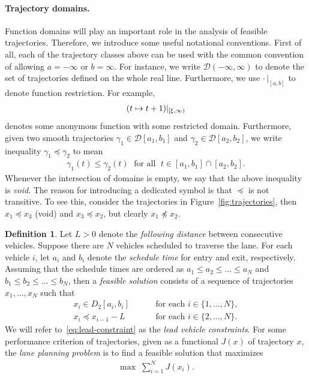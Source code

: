 \documentclass[a4paper]{article}
\theoremstyle{definition}
\newtheorem{define}{Definition\hspace{0.25em}\ignorespaces}
\theoremstyle{plain}
\begin{document}
\paragraph{Trajectory domains.}
Function domains will play an important role in the analysis of feasible
trajectories. Therefore, we introduce some useful notational conventions.
%
First of all, each of the trajectory classes above can be used with the common
convention of allowing $a = -\infty$ or $b = \infty$. For instance, we write
$\mathcal{D}(-\infty, \infty)$ to denote the set of trajectories defined on the
whole real line.
%
Furthermore, we use $\cdot\,|_{[a,b]}$ to denote function restriction. For example,
\begin{align*}
  (t \mapsto t + 1)|_{[\xi,\infty)}
\end{align*}
denotes some anonymous function with some restricted domain.
%
Furthermore, given two smooth trajectories $\gamma_{1} \in \mathcal{D}[a_{1}, b_{1}]$
and $\gamma_{2} \in \mathcal{D}[a_{2}, b_{2}]$, we write inequality
  $\gamma_{1} \preceq \gamma_{2}$ to mean
\begin{align*}
\gamma_{1}(t) \leq \gamma_{2}(t) \; \text{ for all } \; t \in [a_{1}, b_{1}] \cap [a_{2}, b_{2}] .
\end{align*}
%
Whenever the intersection of domains is empty, we say that the above inequality
is \emph{void}.
%
The reason for introducing a dedicated symbol is that $\preceq$ is not transitive.
To see this, consider the trajectories in Figure~\ref{fig:trajectories}, then
$x_{1} \preceq x_{3}$ (void) and $x_{3} \preceq x_{2}$, but clearly
$x_{1} \npreceq x_{2}$.

\begin{define}
  Let $L > 0$ denote the \textit{following distance} between consecutive vehicles.
  Suppose there are $N$ vehicles scheduled to traverse the lane. For each
  vehicle $i$, let $a_{i}$ and $b_{i}$ denote the \textit{schedule time} for entry and
  exit, respectively.
  Assuming that the schedule times are ordered as
  $a_{1} \leq a_{2} \leq \dots \leq a_{N}$ and
  $b_{1} \leq b_{2} \leq \dots \leq b_{N} $, then a \emph{feasible solution} consists
  of a sequence of trajectories $x_{1}, \dots, x_{N}$ such that
\begin{subequations}\label{eq:feasibility}
\begin{align}
x_{i} \in D_{2}[a_{i}, b_{i}] \quad \quad & \text{ for each } i \in \{1, \dots, N\}, \label{eq:second-order-constraint} \\
x_{i} \preceq x_{i-1} - L \quad \quad & \text{ for each } i \in \{2, \dots, N\} . \label{eq:lead-constraint}
\end{align}
\end{subequations}
We will refer to~\eqref{eq:lead-constraint} as the \emph{lead vehicle
  constraints}.
%
For some performance criterion of trajectories, given as a functional $J(x)$ of
trajectory $x$, the \emph{lane planning problem} is to find a feasible solution that
maximizes
\begin{align}\label{eq:objective}
  \max \; \sum_{i=1}^{N} J(x_{i}) .
\end{align}
\end{define}
\end{document}
